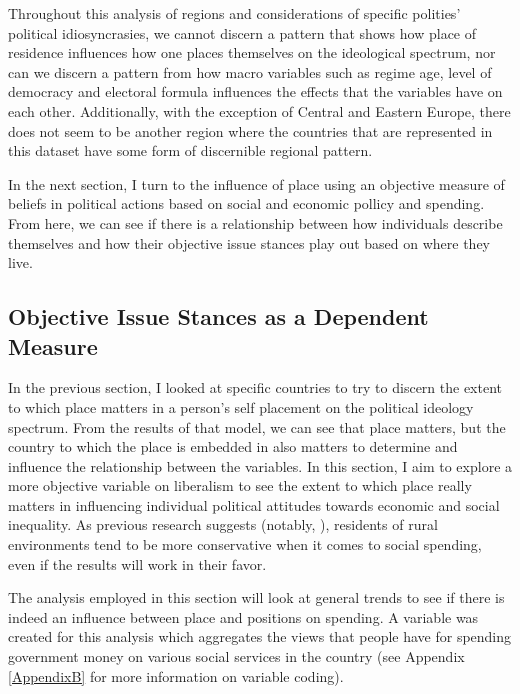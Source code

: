 \documentclass[12pt, titlepage]{article}
\begin{document}
Throughout this analysis of regions and considerations of specific polities' political idiosyncrasies, we cannot discern a pattern that shows how place of residence influences how one places themselves on the ideological spectrum, nor can we discern a pattern from how macro variables such as regime age, level of democracy and electoral formula influences the effects that the variables have on each other. Additionally, with the exception of Central and Eastern Europe, there does not seem to be another region where the countries that are represented in this dataset have some form of discernible regional pattern.

In the next section, I turn to the influence of place using an objective measure of beliefs in political actions based on social and economic pollicy and spending. From here, we can see if there is a relationship between how individuals describe themselves and how their objective issue stances play out based on where they live.

\subsection{Objective Issue Stances as a Dependent Measure}

In the previous section, I looked at specific countries to try to discern the extent to which place matters in a person's self placement on the political ideology spectrum. From the results of that model, we can see that place matters, but the country to which the place is embedded in also matters to determine and influence the relationship between the variables. In this section, I aim to explore a more objective variable on liberalism to see the extent to which place really matters in influencing individual political attitudes towards economic and social inequality. As previous research suggests (notably, \cite{walsh_putting_2012}), residents of rural environments tend to be more conservative when it comes to social spending, even if the results will work in their favor. 

The analysis employed in this section will look at general trends to see if there is indeed an influence between place and positions on spending. A variable was created for this analysis which aggregates the views that people have for spending government money on various social services in the country (see Appendix \ref{AppendixB} for more information on variable coding). 
\end{document}
